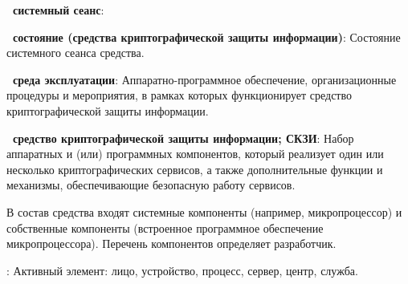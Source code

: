 {\bf \thedefctr~системный сеанс}:


{\bf \thedefctr~состояние (средства криптографической защиты информации)}:
Состояние системного сеанса средства.

{\bf \thedefctr~среда эксплуатации}:
Аппаратно-программное обеспечение, организационные процедуры и мероприятия,
в рамках которых функционирует средство криптографической защиты информации.

{\bf \thedefctr~средство криптографической защиты информации; СКЗИ}:
Набор аппаратных и (или) программных компонентов, который реализует один или 
несколько криптографических сервисов, а также дополнительные функции и 
механизмы, обеспечивающие безопасную работу сервисов.

\begin{note}
В состав средства входят системные компоненты (например, микропроцессор) и
собственные компоненты (встроенное программное обеспечение микропроцессора).
Перечень компонентов определяет разработчик.
\end{note}


:
Активный элемент: лицо, устройство, процесс, сервер, центр, служба.


